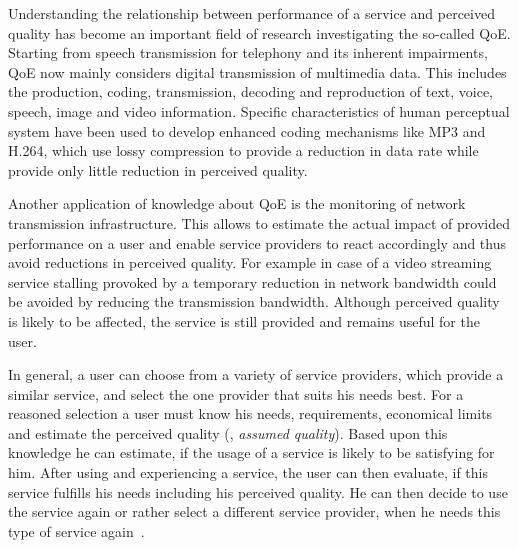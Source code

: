 Understanding the relationship between performance of a service and perceived quality has become an important field of research investigating the so-called \ac{QoE}.
Starting from speech transmission for telephony \citep[\cf,][]{licgee_ieee_1969} and its inherent impairments, \ac{QoE} now mainly considers digital transmission of multimedia data. %
This includes the production, coding, transmission, decoding and reproduction of text, voice, speech, image and video information.
Specific characteristics of human perceptual system have been used to develop enhanced coding mechanisms like \ac{MP3} and \ac{H.264}, which use lossy compression to provide a reduction in data rate while provide only little reduction in perceived quality.

Another application of knowledge about \ac{QoE} is the monitoring of network transmission infrastructure.
This allows to estimate the actual impact of provided performance on a user and enable service providers to react accordingly and thus avoid reductions in perceived quality.
For example in case of a video streaming service stalling provoked by a temporary reduction in network bandwidth could be avoided by reducing the transmission bandwidth.
Although perceived quality is likely to be affected, the service is still provided and remains useful for the user.

In general, a user can choose from a variety of service providers, which provide a similar service, and select the one provider that suits his needs best.
For a reasoned selection a user must know his needs, requirements, economical limits and estimate the perceived quality (\ie, \emph{assumed quality}).
Based upon this knowledge he can estimate, if the usage of a service is likely to be satisfying for him.
After using and experiencing a service, the user can then evaluate, if this service fulfills his needs including his perceived quality.
He can then decide to use the service again or rather select a different service provider, when he needs this type of service again~\citep[\cf,][]{geerts_linking_2010}.

